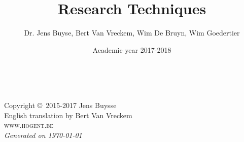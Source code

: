 \documentclass[11pt,fleqn,a4paper]{book}
\author{Dr. Jens Buyse, Bert {Van Vreckem}, Wim {De Bruyn}, Wim Goedertier}
\title{Research Techniques}
\date{Academic year 2017-2018}
\begin{document}
\thetitlepage


\newpage
~\vfill
\thispagestyle{empty}

\noindent Copyright \copyright\ 2015-2017 Jens Buysse\\ %

\noindent English translation by Bert Van Vreckem\\

\noindent \textsc{www.hogent.be}\\ %

\noindent \textit{Generated on \today} %


\usechapterimagefalse

\tableofcontents %

\cleardoublepage %

\setlength{\parindent}{0pt}

\def\R{\mathbb{R}}











\appendix



\clearpage
{}
\printbibliography

\clearpage
{}
\printindex
\end{document}
